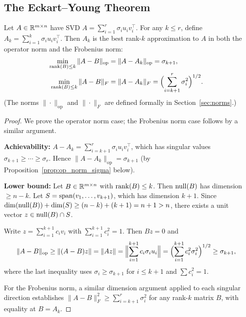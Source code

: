 \documentclass[11pt,a4paper]{article}
\begin{document}
\subsection{The Eckart--Young Theorem}

\begin{keyresult}[title={Best Low-Rank Approximation}]
\begin{theorem}
\label{thm:eckart_young}
Let $A \in \mathbb{R}^{m \times n}$ have SVD $A = \sum_{i=1}^r \sigma_i u_i v_i^\top$.
For any $k \leq r$, define $A_k = \sum_{i=1}^k \sigma_i u_i v_i^\top$.
Then $A_k$ is the best rank-$k$ approximation to $A$ in both the
operator norm and the Frobenius norm:
\begin{align}
  \min_{\operatorname{rank}(B) \leq k} \|A - B\|_{\mathrm{op}} &= \|A - A_k\|_{\mathrm{op}} = \sigma_{k+1},
  \label{eq:eckart_young_op} \\
  \min_{\operatorname{rank}(B) \leq k} \|A - B\|_{F} &= \|A - A_k\|_{F}
  = \Bigl(\sum_{i=k+1}^r \sigma_i^2\Bigr)^{1/2}.
  \label{eq:eckart_young_frob}
\end{align}
(The norms $\|\cdot\|_{\mathrm{op}}$ and $\|\cdot\|_F$ are defined
formally in Section~\ref{sec:norms}.)
\end{theorem}
\end{keyresult}

\begin{proof}
We prove the operator norm case; the Frobenius norm case follows by a
similar argument.

\textbf{Achievability:} $A - A_k = \sum_{i=k+1}^r \sigma_i u_i v_i^\top$,
which has singular values $\sigma_{k+1} \geq \cdots \geq \sigma_r$.
Hence $\|A - A_k\|_{\mathrm{op}} = \sigma_{k+1}$ (by
Proposition~\ref{prop:op_norm_sigma} below).

\textbf{Lower bound:} Let $B \in \mathbb{R}^{m \times n}$ with
$\operatorname{rank}(B) \leq k$.  Then $\operatorname{null}(B)$ has dimension
$\geq n - k$.  Let $S = \operatorname{span}(v_1, \ldots, v_{k+1})$, which has
dimension $k + 1$.  Since $\dim(\operatorname{null}(B)) + \dim(S) \geq
(n - k) + (k + 1) = n + 1 > n$, there exists a unit vector
$z \in \operatorname{null}(B) \cap S$.

Write $z = \sum_{i=1}^{k+1} c_i v_i$ with $\sum_{i=1}^{k+1} c_i^2 = 1$.
Then $Bz = 0$ and
\[
  \|A - B\|_{\mathrm{op}} \geq \|(A - B)z\| = \|Az\|
  = \Bigl\|\sum_{i=1}^{k+1} c_i \sigma_i u_i\Bigr\|
  = \Bigl(\sum_{i=1}^{k+1} c_i^2 \sigma_i^2\Bigr)^{1/2}
  \geq \sigma_{k+1},
\]
where the last inequality uses $\sigma_i \geq \sigma_{k+1}$ for
$i \leq k+1$ and $\sum c_i^2 = 1$.

For the Frobenius norm, a similar dimension argument applied to each
singular direction establishes $\|A - B\|_F^2 \geq \sum_{i=k+1}^r \sigma_i^2$
for any rank-$k$ matrix $B$, with equality at $B = A_k$.
\end{proof}
\end{document}
